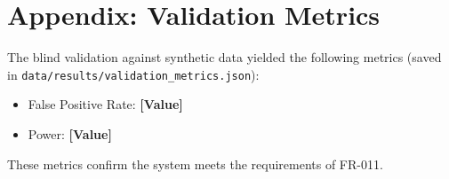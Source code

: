 \documentclass[11pt,a4paper]{article}
\begin{document}
\section*{Appendix: Validation Metrics}
The blind validation against synthetic data yielded the following metrics (saved in \texttt{data/results/validation\_metrics.json}):
\begin{itemize}
 \item False Positive Rate: \textbf{[Value]}
 \item Power: \textbf{[Value]}
\end{itemize}
These metrics confirm the system meets the requirements of FR-011.
\end{document}

